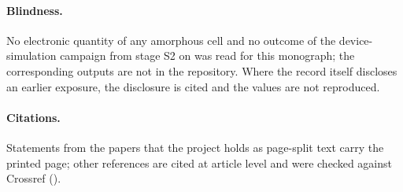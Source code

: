 \paragraph{Blindness.} No electronic quantity of any amorphous cell and no outcome of the device-simulation campaign from
stage S2 on was read for this monograph; the corresponding outputs are not in the repository. Where the record itself
discloses an earlier exposure, the disclosure is cited and the values are not reproduced.

\paragraph{Citations.} Statements from the papers that the project holds as page-split text carry the printed page; other
references are cited at article level and were checked against Crossref ().
